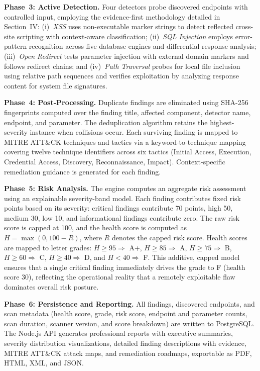 \documentclass[conference]{IEEEtran}
\begin{document}
\textbf{Phase~3: Active Detection.} Four detectors probe discovered endpoints with controlled input, employing the evidence-first methodology detailed in Section~IV: (i)~\textit{XSS} uses non-executable marker strings to detect reflected cross-site scripting with context-aware classification; (ii)~\textit{SQL Injection} employs error-pattern recognition across five database engines and differential response analysis; (iii)~\textit{Open Redirect} tests parameter injection with external domain markers and follows redirect chains; and (iv)~\textit{Path Traversal} probes for local file inclusion using relative path sequences and verifies exploitation by analyzing response content for system file signatures.

\textbf{Phase~4: Post-Processing.} Duplicate findings are eliminated using SHA-256 fingerprints computed over the finding title, affected component, detector name, endpoint, and parameter. The deduplication algorithm retains the highest-severity instance when collisions occur. Each surviving finding is mapped to MITRE ATT\&CK techniques and tactics via a keyword-to-technique mapping covering twelve technique identifiers across six tactics (Initial Access, Execution, Credential Access, Discovery, Reconnaissance, Impact). Context-specific remediation guidance is generated for each finding.

\textbf{Phase~5: Risk Analysis.} The engine computes an aggregate risk assessment using an explainable severity-band model. Each finding contributes fixed risk points based on its severity: critical findings contribute 70 points, high 50, medium 30, low 10, and informational findings contribute zero. The raw risk score is capped at 100, and the health score is computed as $H = \max(0, 100 - R)$, where $R$ denotes the capped risk score. Health scores are mapped to letter grades: $H \geq 95 \Rightarrow$ A+, $H \geq 85 \Rightarrow$ A, $H \geq 75 \Rightarrow$ B, $H \geq 60 \Rightarrow$ C, $H \geq 40 \Rightarrow$ D, and $H < 40 \Rightarrow$ F. This additive, capped model ensures that a single critical finding immediately drives the grade to F (health score 30), reflecting the operational reality that a remotely exploitable flaw dominates overall risk posture.

\textbf{Phase~6: Persistence and Reporting.} All findings, discovered endpoints, and scan metadata (health score, grade, risk score, endpoint and parameter counts, scan duration, scanner version, and score breakdown) are written to PostgreSQL. The Node.js API generates professional reports with executive summaries, severity distribution visualizations, detailed finding descriptions with evidence, MITRE ATT\&CK attack maps, and remediation roadmaps, exportable as PDF, HTML, XML, and JSON.
\end{document}
